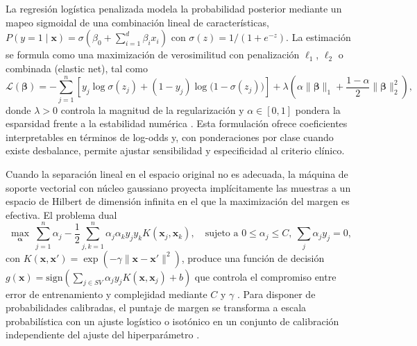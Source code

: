 La regresión logística penalizada modela la probabilidad posterior mediante un mapeo sigmoidal de una combinación lineal de características, \(P(y=1\mid\mathbf{x})=\sigma(\beta_{0}+\sum_{i=1}^{d}\beta_{i}x_{i})\) con \(\sigma(z)=1/(1+e^{-z})\). La estimación se formula como una maximización de verosimilitud con penalización \(\ell_{1}\), \(\ell_{2}\) o combinada (elastic net), tal como
\begin{equation}
\mathcal{L}(\boldsymbol{\beta})=-\sum_{j=1}^{n}\!\left[y_{j}\log \sigma(z_{j})+(1-y_{j})\log\!\big(1-\sigma(z_{j})\big)\right]
+\lambda\!\left(\alpha\lVert\boldsymbol{\beta}\rVert_{1}+\frac{1-\alpha}{2}\lVert\boldsymbol{\beta}\rVert_{2}^{2}\right),
\label{eq:logit_elasticnet}
\end{equation}
donde \(\lambda>0\) controla la magnitud de la regularización y \(\alpha\in[0,1]\) pondera la esparsidad frente a la estabilidad numérica \cite{Pedregosa2011}. Esta formulación ofrece coeficientes interpretables en términos de log-odds y, con ponderaciones por clase cuando existe desbalance, permite ajustar sensibilidad y especificidad al criterio clínico.

Cuando la separación lineal en el espacio original no es adecuada, la máquina de soporte vectorial con núcleo gaussiano proyecta implícitamente las muestras a un espacio de Hilbert de dimensión infinita en el que la maximización del margen es efectiva. El problema dual
\begin{equation}
\max_{\boldsymbol{\alpha}}\ \sum_{j=1}^{n}\alpha_{j}-\frac{1}{2}\sum_{j,k=1}^{n}\alpha_{j}\alpha_{k}y_{j}y_{k}K(\mathbf{x}_{j},\mathbf{x}_{k}),
\quad \text{sujeto a } 0\le \alpha_{j}\le C,\ \sum_{j}\alpha_{j}y_{j}=0,
\label{eq:svm_dual}
\end{equation}
con \(K(\mathbf{x},\mathbf{x}')=\exp(-\gamma\lVert\mathbf{x}-\mathbf{x}'\rVert^{2})\), produce una función de decisión \(g(\mathbf{x})=\mathrm{sign}(\sum_{j\in SV}\alpha_{j}y_{j}K(\mathbf{x},\mathbf{x}_{j})+b)\) que controla el compromiso entre error de entrenamiento y complejidad mediante \(C\) y \(\gamma\) \cite{Pedregosa2011}. Para disponer de probabilidades calibradas, el puntaje de margen se transforma a escala probabilística con un ajuste logístico o isotónico en un conjunto de calibración independiente del ajuste del hiperparámetro \cite{Pedregosa2011}.

